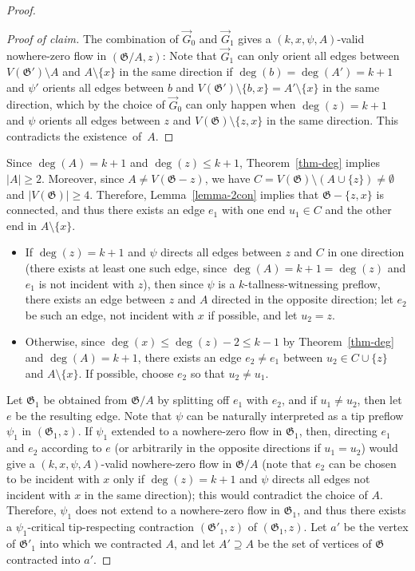 \documentclass{article}
\newcommand\g{\mathfrak{G}}
\newenvironment{subproof}{%
  \renewcommand{\qedsymbol}{$\blacksquare$}%
  \begin{proof}[Proof of claim]%
}{%
  \end{proof}%
}
\begin{document}
\begin{proof}
\begin{subproof}
The combination of $\vec{G}_0$ and $\vec{G}_1$ gives a $(k,x,\psi,A)$-valid nowhere-zero flow in $(\g /A,z)$:
Note that $\vec{G}_1$ can only orient all edges between $V(\g')\setminus A$ and $A\setminus \{x\}$
in the same direction if $\deg(b)=\deg(A')=k+1$ and $\psi'$ orients all edges between $b$ and $V(\g')\setminus \{b,x\}=A'\setminus\{x\}$ in the same direction,
which by the choice of $\vec{G}_0$ can only happen when $\deg(z)=k+1$ and $\psi$ orients all edges between $z$ and $V(\g)\setminus\{z,x\}$ in the same direction.
This contradicts the existence~of~$A$. 
\end{subproof}
Since $\deg(A)=k+1$ and $\deg(z)\le k+1$, Theorem~\ref{thm-deg} implies $|A|\ge 2$.  Moreover, since $A\neq V(\g-z)$,
we have $C=V(\g)\setminus(A\cup\{z\})\neq\emptyset$ and $|V(\g)|\ge 4$.  Therefore, Lemma~\ref{lemma-2con} implies that $\g-\{z,x\}$ is connected,
and thus there exists an edge $e_1$ with one end $u_1\in C$ and the other end in $A\setminus \{x\}$.
\begin{itemize}
\item If $\deg(z)=k+1$ and $\psi$ directs all edges between $z$ and $C$ in one direction
(there exists at least one such edge, since $\deg(A)=k+1=\deg(z)$ and $e_1$ is not incident with $z$), then since $\psi$ is a $k$-tallness-witnessing preflow,
there exists an edge between $z$ and $A$ directed in the opposite direction; let $e_2$ be such an edge, not incident with $x$ if possible, and let $u_2=z$.
\item Otherwise, since $\deg(x)\le \deg(z)-2\le k-1$ by Theorem~\ref{thm-deg} and $\deg(A)=k+1$, there exists an edge $e_2\neq e_1$ between $u_2\in C \cup \{z\}$
and $A\setminus\{x\}$.  If possible, choose $e_2$ so that $u_2\neq u_1$.
\end{itemize}


Let $\g_1$ be obtained from $\g/A$ by splitting off $e_1$ with $e_2$, and if $u_1\neq u_2$, then let $e$ be the resulting edge.  Note that $\psi$ can be naturally interpreted
as a tip preflow $\psi_1$ in $(\g_1,z)$.  If $\psi_1$ extended to a nowhere-zero flow in $\g_1$, then, directing $e_1$ and $e_2$ according
to $e$ (or arbitrarily in the opposite directions if $u_1=u_2$) would give a $(k, x,\psi,A)$-valid nowhere-zero flow in $\g/A$
(note that $e_2$ can be chosen to be incident with $x$ only if $\deg(z)=k+1$ and $\psi$ directs all edges not incident with $x$ in the same direction);
this would contradict the choice of $A$.  Therefore, $\psi_1$ does not extend to a nowhere-zero flow in $\g_1$, and thus
there exists a $\psi_1$-critical tip-respecting contraction $(\g'_1,z)$ of $(\g_1,z)$.
Let $a'$ be the vertex of $\g'_1$ into which we contracted $A$, and let $A'\supseteq A$ be the set of vertices of $\g$ contracted into $a'$.


\end{proof}
\end{document}
